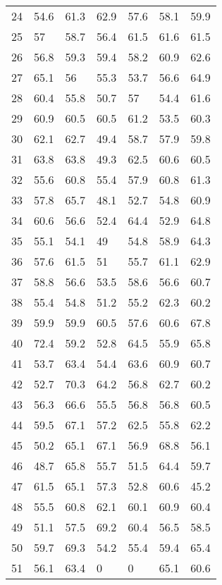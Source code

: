 \begin{longtable}{lllllll}
24  & 54.6 & 61.3 & 62.9    & 57.6    & 58.1 & 59.9 \\
25  & 57   & 58.7 & 56.4    & 61.5    & 61.6 & 61.5 \\
26  & 56.8 & 59.3 & 59.4    & 58.2    & 60.9 & 62.6 \\
27  & 65.1 & 56   & 55.3    & 53.7    & 56.6 & 64.9 \\
28  & 60.4 & 55.8 & 50.7    & 57      & 54.4 & 61.6 \\
29  & 60.9 & 60.5 & 60.5    & 61.2    & 53.5 & 60.3 \\
30  & 62.1 & 62.7 & 49.4    & 58.7    & 57.9 & 59.8 \\
31  & 63.8 & 63.8 & 49.3    & 62.5    & 60.6 & 60.5 \\
32  & 55.6 & 60.8 & 55.4    & 57.9    & 60.8 & 61.3 \\
33  & 57.8 & 65.7 & 48.1    & 52.7    & 54.8 & 60.9 \\
34  & 60.6 & 56.6 & 52.4    & 64.4    & 52.9 & 64.8 \\
35  & 55.1 & 54.1 & 49      & 54.8    & 58.9 & 64.3 \\
36  & 57.6 & 61.5 & 51      & 55.7    & 61.1 & 62.9 \\
37  & 58.8 & 56.6 & 53.5    & 58.6    & 56.6 & 60.7 \\
38  & 55.4 & 54.8 & 51.2    & 55.2    & 62.3 & 60.2 \\
39  & 59.9 & 59.9 & 60.5    & 57.6    & 60.6 & 67.8 \\
40  & 72.4 & 59.2 & 52.8    & 64.5    & 55.9 & 65.8 \\
41  & 53.7 & 63.4 & 54.4    & 63.6    & 60.9 & 60.7 \\
42  & 52.7 & 70.3 & 64.2    & 56.8    & 62.7 & 60.2 \\
43  & 56.3 & 66.6 & 55.5    & 56.8    & 56.8 & 60.5 \\
44  & 59.5 & 67.1 & 57.2    & 62.5    & 55.8 & 62.2 \\
45  & 50.2 & 65.1 & 67.1    & 56.9    & 68.8 & 56.1 \\
46  & 48.7 & 65.8 & 55.7    & 51.5    & 64.4 & 59.7 \\
47  & 61.5 & 65.1 & 57.3    & 52.8    & 60.6 & 45.2 \\
48  & 55.5 & 60.8 & 62.1    & 60.1    & 60.9 & 60.4 \\
49  & 51.1 & 57.5 & 69.2    & 60.4    & 56.5 & 58.5 \\
50  & 59.7 & 69.3 & 54.2    & 55.4    & 59.4 & 65.4 \\
51  & 56.1 & 63.4 & 0       & 0       & 65.1 & 60.6 \\

\end{longtable}
